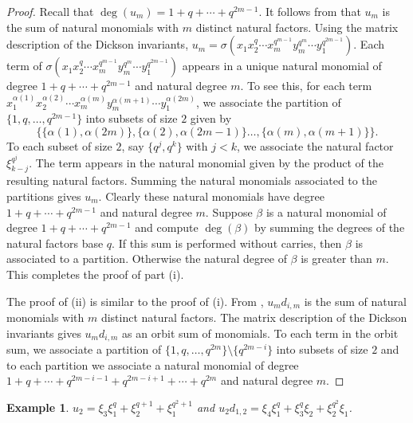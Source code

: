 \documentclass{amsart}
\newtheorem{example}[subsection]{Example}
\begin{document}
\begin{proof} Recall that $\deg(u_m)=1+q+\cdots+q^{2m-1}$. It follows from \cite[Prop. 8.3.3]{benson-polyinvafinigrou:93}
that $u_m$ is the sum of natural monomials with $m$ distinct natural factors.
Using the matrix description of the Dickson invariants,
$u_m=\sigma(x_1x_2^q\cdots x_m^{q^{m-1}}y_m^{q^m}\cdots y_1^{q^{2m-1}})$.
Each term of $\sigma(x_1x_2^q\cdots x_m^{q^{m-1}}y_m^{q^m}\cdots y_1^{q^{2m-1}})$ appears in a unique natural monomial of degree 
$1+q+\cdots +q^{2m-1}$ and natural degree $m$. To see this,
for each term 
$x_1^{\alpha(1)}x_2^{\alpha(2)}\cdots x_m^{\alpha(m)}y_m^{\alpha(m+1)}\cdots y_1^{\alpha(2m)}$, we associate the partition of $\{1,q,\ldots,q^{2m-1}\}$
into subsets of size $2$ given by 
$$\{\{\alpha(1),\alpha(2m)\},\{\alpha(2),\alpha(2m-1)\}
\ldots,\{\alpha(m),\alpha(m+1)\}\}.$$
To each subset of size $2$, say $\{q^j,q^k\}$ with $j<k$, we associate the natural factor $\xi_{k-j}^{q^j}$. The term appears in the natural monomial given by the product of the resulting natural factors. Summing the natural monomials associated to the partitions gives $u_m$. Clearly these natural monomials have degree $1+q+\cdots +q^{2m-1}$ and natural degree $m$. Suppose $\beta$ is a natural monomial of degree
$1+q+\cdots +q^{2m-1}$ and compute $\deg(\beta)$
by summing the degrees of the natural factors base $q$. If this sum is performed without carries, then $\beta$ is associated to a partition. Otherwise the natural degree of $\beta$ is greater than $m$. This completes the proof of part (i).

The proof of (ii) is similar to the proof of (i).
From \cite[Prop. 8.3.3]{benson-polyinvafinigrou:93},
$u_md_{i,m}$ is the sum of natural monomials with $m$ distinct natural factors.
The matrix description of the Dickson invariants gives $u_md_{i,m}$
as an orbit sum of monomials. To each term in the orbit sum, we associate
a partition of $\{1,q,\ldots,q^{2m}\}\setminus\{q^{2m-i}\}$ into subsets of size $2$ and to each partition we associate a natural monomial of
degree $1+q+\cdots +q^{2m-i-1}+q^{2m-i+1}+\cdots +q^{2m}$ and natural degree $m$.
\end{proof}

\begin{example} 
$u_2=\xi_3\xi_1^q+\xi_2^{q+1}+\xi_1^{q^2+1}$ and $u_2d_{1,2}=\xi_4\xi_1^q+\xi_3^q\xi_2+\xi_2^{q^2}\xi_1$.
\end{example}
\end{document}
